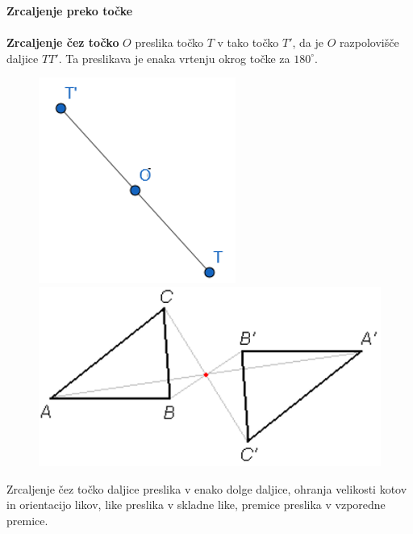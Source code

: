         
        \begin{frame}
            \large\textbf{Zrcaljenje preko točke}
            ~\\
            ~\\
            \normalsize
            \textbf{Zrcaljenje čez točko} $O$ preslika točko $T$ v tako točko $T'$, da je $O$ razpolovišče daljice $TT'$. Ta preslikava je enaka vrtenju okrog točke za $180^\circ$.

            \begin{figure}
                \includegraphics[scale=0.5]{Slike in skice/Zrcaljenje_tocke_cez_tocko.png}
                \includegraphics[scale=0.5]{Slike in skice/Zrcaljenje_lika_cez_tocko.png}
            \end{figure}

            Zrcaljenje čez točko daljice preslika v enako dolge daljice, ohranja velikosti kotov in orientacijo likov, like preslika v skladne like, premice preslika v vzporedne premice.

        \end{frame}



